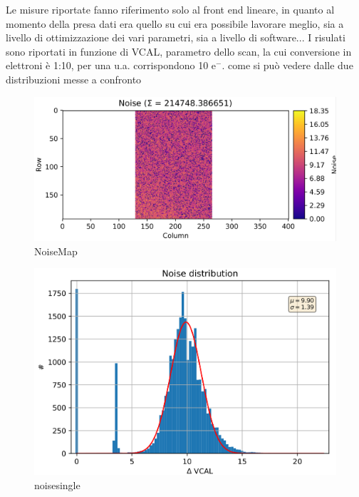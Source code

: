 Le misure riportate fanno riferimento solo al front end lineare, in quanto al momento della presa dati era quello su cui era possibile lavorare meglio, sia a livello di ottimizzazione dei vari parametri, sia a livello di software...
I risulati sono riportati in funzione di VCAL, parametro dello scan, la cui conversione in elettroni è 1:10, per una u.a. corrispondono 10 $\mathrm{e^{-}}$.
come si può vedere dalle due distribuzioni messe a confronto
\begin{figure}
\centering
\includegraphics[scale=.3]{Immagini/NoiseMap}
\caption{NoiseMap}
\label{NoiseMap}
\end{figure}
\begin{figure}
\centering
\includegraphics[scale=.3]{Immagini/NoiseSingle}
\caption{noisesingle}
\label{noisesingle}
\end{figure}

